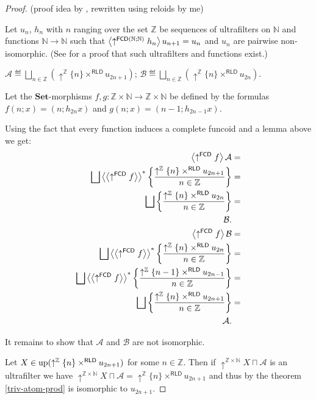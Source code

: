 \begin{proof}
(proof idea by , rewritten using reloids by me)

Let $u_{n}$, $h_{n}$ with $n$ ranging over the set $\mathbb{Z}$
be sequences of ultrafilters on $\mathbb{N}$ and functions $\mathbb{N}\rightarrow\mathbb{N}$
such that $\left\langle \uparrow^{\mathsf{FCD}(\mathbb{N};\mathbb{N})}h_{n}\right\rangle u_{n+1}=u_{n}$
and $u_{n}$ are pairwise non-isomorphic. (See \cite{kleene-degrees}
for a proof that such ultrafilters and functions exist.)

$\mathcal{A}\eqdef\bigsqcup_{n\in\mathbb{Z}}(\uparrow^{\mathbb{Z}}\{n\}\times^{\mathsf{RLD}} u_{2n+1})$;
$\mathcal{B}\eqdef\bigsqcup_{n\in\mathbb{Z}}(\uparrow^{\mathbb{Z}}\{n\}\times^{\mathsf{RLD}} u_{2n})$.

Let the $\mathbf{Set}$-morphisms $f,g:\mathbb{Z}\times\mathbb{N}\rightarrow\mathbb{Z}\times\mathbb{N}$
be defined by the formulas $f(n;x)=(n;h_{2n}x)$ and $g(n;x)=(n-1;h_{2n-1}x)$.

Using the fact that every function induces a complete funcoid and
a lemma above we get:
\begin{align*}
\left\langle \uparrow^{\mathsf{FCD}}f\right\rangle\mathcal{A} & =\\
\bigsqcup\left\langle \left\langle \uparrow^{\mathsf{FCD}}f\right\rangle\right\rangle ^{\ast}\left\{ \frac{\uparrow^{\mathbb{Z}}\{n\}\times^{\mathsf{RLD}} u_{2n+1}}{n\in\mathbb{Z}}\right\} & =\\
\bigsqcup\left\{ \frac{\uparrow^{\mathbb{Z}}\{n\}\times^{\mathsf{RLD}} u_{2n}}{n\in\mathbb{Z}}\right\} & =\\
\mathcal{B}.\\
\left\langle \uparrow^{\mathsf{FCD}}f\right\rangle\mathcal{B} & =\\
\bigsqcup\left\langle \left\langle \uparrow^{\mathsf{FCD}}f\right\rangle\right\rangle ^{\ast}\left\{ \frac{\uparrow^{\mathbb{Z}}\{n\}\times^{\mathsf{RLD}} u_{2n}}{n\in\mathbb{Z}}\right\} & =\\
\bigsqcup\left\langle \left\langle \uparrow^{\mathsf{FCD}}f\right\rangle\right\rangle ^{\ast}\left\{ \frac{\uparrow^{\mathbb{Z}}\{n-1\}\times^{\mathsf{RLD}} u_{2n-1}}{n\in\mathbb{Z}}\right\} & =\\
\bigsqcup\left\{ \frac{\uparrow^{\mathbb{Z}}\{n\}\times^{\mathsf{RLD}} u_{2n+1}}{n\in\mathbb{Z}}\right\} & =\\
\mathcal{A}.
\end{align*}


It remains to show that $\mathcal{A}$ and $\mathcal{B}$ are not
isomorphic.

Let $X\in\operatorname{up}(\uparrow^{\mathbb{Z}}\{n\}\times^{\mathsf{RLD}}u_{2n+1})$
for some $n\in\mathbb{Z}$. Then if $\uparrow^{\mathbb{Z}\times\mathbb{N}}X\sqcap\mathcal{A}$
is an ultrafilter we have $\uparrow^{\mathbb{Z}\times\mathbb{N}}X\sqcap\mathcal{A}=\uparrow^{\mathbb{Z}}\{n\}\times^{\mathsf{RLD}}u_{2n+1}$
and thus by the theorem \ref{triv-atom-prod} is isomorphic to $u_{2n+1}$.


\end{proof}
